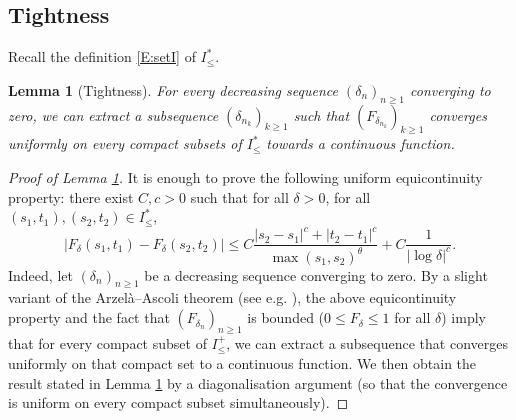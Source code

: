 \documentclass[11pt]{article}
\newtheorem{lemma}[theorem]{Lemma}
\theoremstyle{remark}
\numberwithin{equation}{section}
\begin{document}
\subsection{Tightness}\label{S:crossing_tightness}

Recall the definition \eqref{E:setI} of $I_\leq^*$.

\begin{lemma}[Tightness]\label{L:crossing_tightness}
For every decreasing sequence $(\delta_n)_{n \geq 1}$ converging to zero, we can extract a subsequence $(\delta_{n_k})_{k \geq 1}$ such that $(F_{\delta_{n_k}})_{k \geq 1}$ converges uniformly on every compact subsets of $I_\leq^*$ towards a continuous function.
\end{lemma}



\begin{proof}[Proof of Lemma \ref{L:crossing_tightness}]
It is enough to prove the following uniform equicontinuity property: there exist $C,c>0$ such that for all $\delta >0$, for all $(s_1,t_1), (s_2,t_2) \in I_\leq^*$,
\begin{equation}
\label{E:proof_tightness1}
|F_\delta(s_1,t_1) - F_\delta(s_2,t_2)| \leq C \frac{|s_2-s_1|^c + |t_2-t_1|^c}{\max(s_1,s_2)^\theta} + C \frac{1}{|\log \delta|^c}.
\end{equation}
Indeed, let $(\delta_n)_{n \geq 1}$ be a decreasing sequence converging to zero. By a slight variant of the Arzel\`{a}--Ascoli theorem (see e.g. \cite[Theorem 6.2]{MR3474488}), the above equicontinuity property and the fact that $(F_{\delta_n})_{n \geq 1}$ is bounded ($0 \leq F_\delta \leq 1$ for all $\delta$) imply that for every compact subset of $I_\leq^+$, we can extract a subsequence that converges uniformly on that compact set to a continuous function. We then obtain the result stated in Lemma \ref{L:crossing_tightness} by a diagonalisation argument (so that the convergence is uniform on every compact subset simultaneously).


\end{proof}
\end{document}
